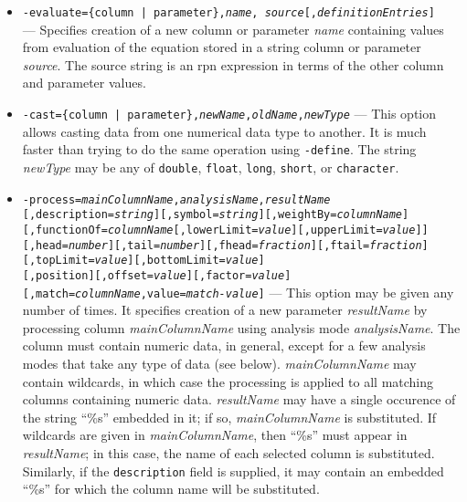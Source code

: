 \begin{itemize}
\begin{itemize}
\begin{itemize}
        \item {\tt -evaluate=\{column | parameter\},{\em name},{\em
source}[,{\em definitionEntries}]}\\ --- Specifies creation of a new column or parameter {\em name}
containing values from evaluation of the equation stored in a string column or parameter {\em source}.
The source string is an rpn expression in terms of the other column and parameter values.

        \item {\tt -cast=\{column | parameter\},{\em newName},{\em oldName},{\em newType}} --- This option allows
casting data from one numerical data type to another.  It is much faster than trying to do the same operation using
{\tt -define}.  The string {\em newType} may be any of {\tt double}, {\tt float}, {\tt long}, {\tt short}, or
{\tt character}.

        \item {\tt -process={\em mainColumnName},{\em analysisName},{\em resultName}}
\\{\tt [,description={\em string}][,symbol={\em string}][,weightBy={\em columnName}]}
\\{\tt [,functionOf={\em columnName}[,lowerLimit={\em value}][,upperLimit={\em value}]]}
\\{\tt [,head={\em number}][,tail={\em number}][,fhead={\em fraction}][,ftail={\em fraction}]}
\\{\tt [,topLimit={\em value}][,bottomLimit={\em value}]} 
\\{\tt [,position][,offset={\em value}][,factor={\em value}]}
\\{\tt [,match={\em columnName},value={\em match-value}]} --- This option may be given
any number of times.  It specifies creation of a new parameter {\em resultName} by processing
column {\em mainColumnName} using analysis mode {\em analysisName}.  The column must contain
numeric data, in general, except for a few analysis modes that take any type of data (see below). {\em
mainColumnName} may contain wildcards, in which case the processing is applied to all matching
columns containing numeric data.  {\em resultName} may have a single occurence of the string
``\%s'' embedded in it; if so, {\em mainColumnName} is substituted.  If wildcards are given in
{\em mainColumnName}, then ``\%s'' must appear in {\em resultName}; in this case, the name of
each selected column is substituted.  Similarly, if the {\tt description} field is supplied,
it may contain an embedded ``\%s'' for which the column name will be substituted.


\end{itemize}
\end{itemize}
\end{itemize}
